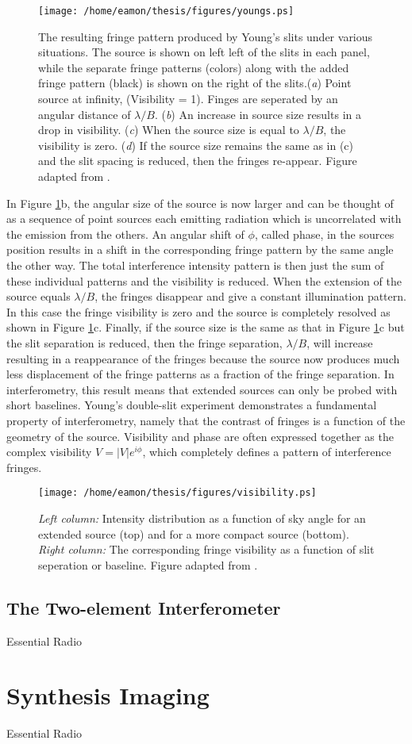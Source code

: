 \begin{figure}[hbt!]
\centering 
          \texttt{[image: /home/eamon/thesis/figures/youngs.ps]}
\caption[Fringe pattern produced by Young's slits under various situations.]{The resulting fringe pattern produced by Young's slits under various situations. The source is shown on left left of the slits in each panel, while the separate fringe patterns (colors) along with the added fringe pattern (black) is shown on the right of the slits.(\textit{a}) Point source at infinity, (Visibility = 1). Finges are seperated by an angular distance of $\lambda /B$. (\textit{b}) An increase in source size results in a drop in visibility. (\textit{c}) When the source size is equal to $\lambda /B$, the visibility is zero. (\textit{d}) If the source size remains the same as in (c) and the slit spacing is reduced, then the fringes re-appear. Figure adapted from \cite{jackson_2008}.}
\label{fig2e}
\end{figure}

In Figure \ref{fig2e}b, the angular size of the source is now larger and can be thought of as a sequence of point sources each emitting radiation which is uncorrelated with the emission from the others. An angular shift of $\phi$, called phase, in the sources position results in a shift in the corresponding fringe pattern by the same angle the other way. The total interference intensity pattern is then just the sum of these individual patterns and the visibility is reduced. When the extension of the source equals $\lambda/B$, the fringes disappear and give a constant illumination pattern. In this case the fringe visibility is zero and the source is completely resolved as shown in Figure \ref{fig2e}c. Finally, if the source size is the same as that in Figure \ref{fig2e}c but the slit separation is reduced, then the fringe separation, $\lambda/B$, will increase resulting in a reappearance of the fringes because the source now produces much less displacement of the fringe patterns as a fraction of the fringe separation. In interferometry, this result means that extended sources can only be probed with short baselines. Young's double-slit experiment demonstrates a fundamental property of interferometry, namely that the contrast of fringes is a function of the geometry of the source. Visibility and phase are often expressed together as the complex visibility $V=|V|e^{i\phi}$, which completely defines a pattern of interference fringes.

\begin{figure}[hbt!]
\centering 
          \texttt{[image: /home/eamon/thesis/figures/visibility.ps]}
\caption[Visibilities for various source sizes.]{\textit{Left column:} Intensity distribution as a function of sky angle for an extended source (top) and for a more compact source (bottom). \textit{Right column:} The corresponding fringe visibility as a function of slit seperation or baseline. Figure adapted from \cite{jackson_2008}.}
\label{fig2f}
\end{figure}

\subsection{The Two-element Interferometer}\label{subsec:5}
Essential Radio 
\section{Synthesis Imaging}\label{sec:4}
Essential Radio 